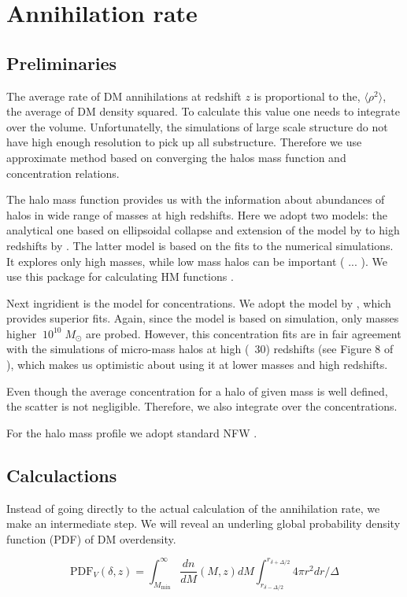 \section{Annihilation rate}

\subsection{Preliminaries}

The average rate of DM annihilations at redshift $z$ is proportional to the, $\langle \rho^2 \rangle$, the average of DM density squared. To calculate this value one needs to integrate over the volume. Unfortunatelly, the simulations of large scale structure do not have high enough resolution to pick up all substructure. Therefore we use approximate method based on converging the halos mass function and concentration relations.

The halo mass function provides us with the information about abundances of halos in wide range of masses at high redshifts. Here we adopt two models: the analytical one based on ellipsoidal collapse \cite{Sheth_2001} and extension of the model by \cite{Tinker_2008} to high redshifts by \cite{Behroozi_2013}. The latter model is based on the fits to the numerical simulations. It explores only high masses, while low mass halos can be important ( ... ). We use this package for calculating HM functions \cite{Murray_2013}.

Next ingridient is the model for concentrations. We adopt the model by \cite{2014arXiv1407.4730D}, which provides superior fits. Again, since the model is based on simulation, only masses higher $~10^{10}\;M_\odot$ are probed. However, this concentration fits are in fair agreement with the simulations of micro-mass halos at high (~30) redshifts (see Figure 8 of \cite{2014arXiv1407.4730D}), which makes us optimistic about using it at lower masses and high redshifts.

Even though the average concentration for a halo of given mass is well defined, the scatter is not negligible. Therefore, we also integrate over the concentrations.

For the halo mass profile we adopt standard NFW \cite{1997ApJ...490..493N}. 

\subsection{Calculactions}
Instead of going directly to the actual calculation of the annihilation rate, we make an intermediate step. We will reveal an underling global probability density function (PDF) of DM overdensity.

\begin{equation}
\mathrm{PDF}_V (\delta, z) = \int_{M_\mathrm{min}}^\infty \dfrac{dn}{dM}(M,z) dM \int_{r_{\delta-\Delta/2}}^{r_{\delta+\Delta/2}} 4\pi r^2 dr / \Delta
\end{equation}


